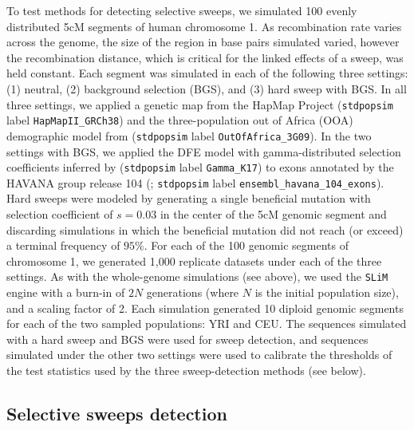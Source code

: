 \documentclass[hidelinks]{article}
\newcommand{\stdpopsim}{\texttt{stdpopsim}\xspace}
\newcommand{\slim}{\texttt{SLiM}\xspace}
\begin{document}
    To test methods for detecting selective sweeps, we simulated 100 evenly distributed 5cM
    segments of human chromosome 1.
    As recombination rate varies across the genome, the size of the region in base pairs simulated varied, however the recombination distance,
    which is critical for the linked effects of a sweep, was held constant.
    Each segment was simulated in each of the following three settings:
    (1) neutral, (2) background selection (BGS), and (3) hard sweep with BGS.
    In all three settings, we applied a genetic map from the HapMap Project
    \citep{international2007second} (\stdpopsim label \texttt{HapMapII\_GRCh38}) and
    the three-population out of Africa (OOA) demographic model from
    \cite{gutenkunst2009inferring} (\stdpopsim label \texttt{OutOfAfrica\_3G09}).
    In the two settings with BGS, we applied the DFE model with gamma-distributed selection coefficients inferred by
    \cite{kim2017inference} (\stdpopsim label \texttt{Gamma\_K17}) to exons annotated by the HAVANA group release 104
    (\cite{ensembl2018}; \stdpopsim label \texttt{ensembl\_havana\_104\_exons}).
    Hard sweeps were modeled by generating a single beneficial mutation 
    with selection coefficient of $s = 0.03$ in the center of the 5cM genomic segment
    and discarding simulations in which the beneficial mutation did not reach (or exceed) a terminal frequency of $95\%$.
    For each of the 100 genomic segments of chromosome 1, we generated 1,000 replicate datasets under each of the three settings.
    As with the whole-genome simulations (see above), we used the \slim engine with a burn-in of $2N$ generations
    (where $N$ is the initial population size), and a scaling factor of 2.
    Each simulation generated 10 diploid genomic segments for each of the two sampled populations: YRI and CEU.
    The sequences simulated with a hard sweep and BGS were used for sweep detection,
    and sequences simulated under the other two settings were used to calibrate the thresholds of the test statistics
    used by the three sweep-detection methods (see below).

    \subsection*{Selective sweeps detection}
    
\end{document}

